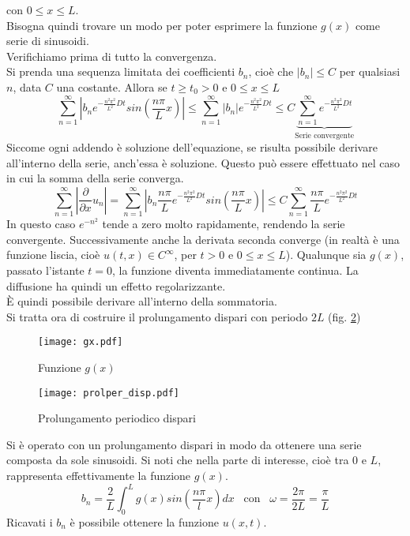 con $0\leq x \leq L$.\\
Bisogna quindi trovare un modo per poter esprimere la funzione $g(x)$
come serie di sinusoidi.\\
Verifichiamo prima di tutto la convergenza.\\
Si prenda una sequenza limitata dei coefficienti $b_n$, cio\`e che
$|b_n|\leq C$ per qualsiasi $n$, data $C$ una costante. Allora se $t \geq t_0 > 0$
e $0\leq x \leq L$
\[
	\sum_{n=1}^{\infty}\left| b_n e^{-\frac{n^2\pi^2}{L^2} Dt}
	sin\left(\frac{n\pi}{L}x \right)\right|
	\leq
	\sum_{n=1}^{\infty}\left| b_n \right| e^{-\frac{n^2\pi^2}{L^2} Dt}
	\leq
	C \underbrace{\sum_{n=1}^{\infty}e^{-\frac{n^2\pi^2}{L^2} Dt}}
	_\text{Serie convergente}
\]
Siccome ogni addendo \`e soluzione dell'equazione, se risulta possibile
derivare all'interno della serie, anch'essa \`e soluzione. Questo pu\`o essere
effettuato nel caso in cui la somma della serie converga.
\[
	\sum_{n=1}^{\infty}\left| \frac{\partial}{\partial x} u_n \right|=
	\sum_{n=1}^{\infty}\left| b_n \frac{n\pi}{L} 
	e^{-\frac{n^2\pi^2}{L^2} Dt}
	sin\left(\frac{n\pi}{L}x \right)\right|
	\leq
	C \sum_{n=1}^{\infty} \frac{n\pi}{L} e^{-\frac{n^2\pi^2}{L^2} Dt}
\]
In questo caso $e^{-n^2}$ tende a zero molto rapidamente, rendendo la serie convergente. Successivamente anche la derivata seconda converge 
(in realt\`a \`e una funzione liscia, cio\`e $u(t,x)\in C^\infty$,
per $t>0$ e $0\leq x \leq L$).
Qualunque sia $g(x)$, passato l'istante $t=0$, la funzione diventa immediatamente
continua. La diffusione ha quindi un effetto regolarizzante.\\
\`E quindi possibile derivare all'interno della sommatoria.\\
Si tratta ora di costruire il prolungamento dispari con periodo $2L$ (fig. \ref{prolper_disp})
\begin{figure}[H]
	\centering
	\texttt{[image: gx.pdf]}
	\caption{Funzione $g(x)$}
	\label{gx}
\end{figure}
\begin{figure}[H]
	\centering
	\texttt{[image: prolper\_disp.pdf]}
	\caption{Prolungamento periodico dispari}
	\label{prolper_disp}
\end{figure}
\noindent
Si \`e operato con un prolungamento dispari in modo da ottenere una serie composta
da sole sinusoidi. Si noti che nella parte di interesse, cio\`e tra $0$ e $L$, 
rappresenta effettivamente la funzione $g(x)$.
\[
	b_n= \frac{2}{L}\int_0^L g(x)sin \left(\frac{n\pi}{l} x\right) dx
	\;\;\; \text{con} \;\;\;
	\omega= \frac{2\pi}{2L}= \frac{\pi}{L}
\]
Ricavati i $b_n$ \`e possibile ottenere la funzione $u(x,t)$.

